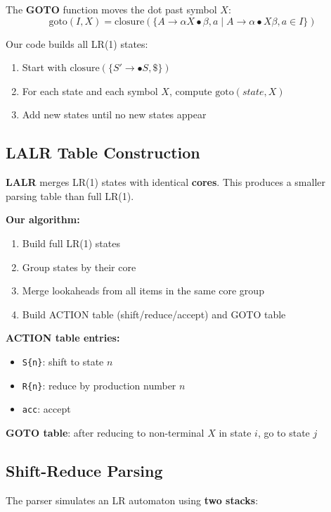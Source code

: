 \documentclass[letterpaper,12pt,oneside]{article}
\begin{document}
	The \textbf{GOTO} function moves the dot past symbol $X$:
	\[
	\text{goto}(I, X) = \text{closure}(\{ A \rightarrow \alpha X \bullet \beta , a \mid A \rightarrow \alpha \bullet X \beta , a \in I \})
	\]
	
	Our code builds all LR(1) states:
	\begin{enumerate}
		\item Start with $\text{closure}(\{S' \rightarrow \bullet S, \$\})$
		\item For each state and each symbol $X$, compute $\text{goto}(state, X)$
		\item Add new states until no new states appear
	\end{enumerate}
	
	\subsection{LALR Table Construction}
	
	\textbf{LALR} merges LR(1) states with identical \textbf{cores}. This produces a smaller parsing table than full LR(1).
	
	\textbf{Our algorithm:}
	\begin{enumerate}
		\item Build full LR(1) states
		\item Group states by their core
		\item Merge lookaheads from all items in the same core group
		\item Build ACTION table (shift/reduce/accept) and GOTO table
	\end{enumerate}
	
	\textbf{ACTION table entries:}
	\begin{itemize}
		\item \texttt{S\{n\}}: shift to state $n$
		\item \texttt{R\{n\}}: reduce by production number $n$
		\item \texttt{acc}: accept
	\end{itemize}
	
	\textbf{GOTO table}: after reducing to non-terminal $X$ in state $i$, go to state $j$
	
	\subsection{Shift-Reduce Parsing}
	
	The parser simulates an LR automaton using \textbf{two stacks}:
	
\end{document}
